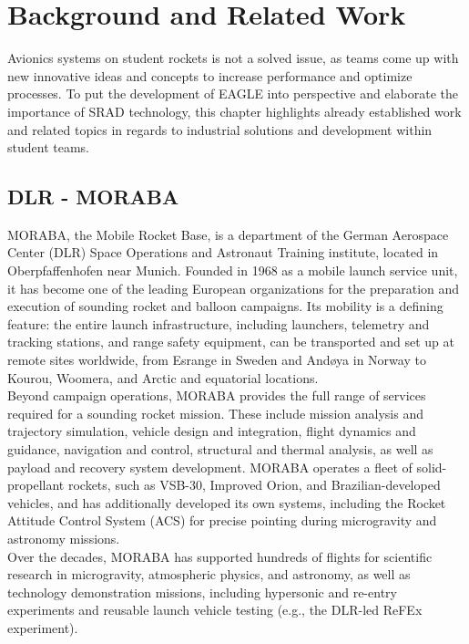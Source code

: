 \documentclass[fontsize=11pt,%
twoside,%
BCOR          = 8mm, %
DIV           = 11,  %
titlepage     = off,%
index=totoc,%
xcolor        = pdftex,%
dvipsnames,%
bibliography  = totoc,%
bibliography = numbered, %
listof        = notnumbered]{scrreprt}
\begin{document}
\newpage

\chapter{Background and Related Work}
Avionics systems on student rockets is not a solved issue, as teams come up with new innovative ideas and concepts to increase performance and optimize processes. To put the development of EAGLE into perspective and elaborate the importance of SRAD technology, this chapter highlights already established work and related topics in regards to industrial solutions and development within student teams.

\section{DLR - MORABA}\label{sec:MORABA}
MORABA, the Mobile Rocket Base, is a department of the German Aerospace Center (DLR) Space Operations and Astronaut Training institute, located in Oberpfaffenhofen near Munich. Founded in 1968 as a mobile launch service unit, it has become one of the leading European organizations for the preparation and execution of sounding rocket and balloon campaigns. Its mobility is a defining feature: the entire launch infrastructure, including launchers, telemetry and tracking stations, and range safety equipment, can be transported and set up at remote sites worldwide, from Esrange in Sweden and Andøya in Norway to Kourou, Woomera, and Arctic and equatorial locations.\\
Beyond campaign operations, MORABA provides the full range of services required for a sounding rocket mission. These include mission analysis and trajectory simulation, vehicle design and integration, flight dynamics and guidance, navigation and control, structural and thermal analysis, as well as payload and recovery system development. MORABA operates a fleet of solid-propellant rockets, such as VSB-30, Improved Orion, and Brazilian-developed vehicles, and has additionally developed its own systems, including the Rocket Attitude Control System (ACS) for precise pointing during microgravity and astronomy missions.\\
Over the decades, MORABA has supported hundreds of flights for scientific research in microgravity, atmospheric physics, and astronomy, as well as technology demonstration missions, including hypersonic and re-entry experiments and reusable launch vehicle testing (e.g., the DLR-led ReFEx experiment)\cite{MORABA}.\\
\end{document}
